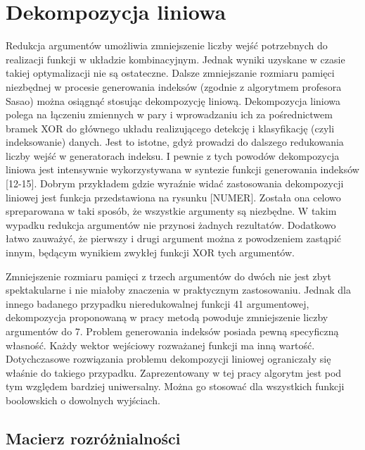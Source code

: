 \chapter{Dekompozycja liniowa}

Redukcja argumentów umożliwia zmniejszenie liczby wejść potrzebnych do realizacji funkcji w układzie kombinacyjnym.
Jednak wyniki uzyskane w czasie takiej optymalizacji nie są ostateczne.
Dalsze zmniejszanie rozmiaru pamięci niezbędnej w procesie generowania indeksów (zgodnie z algorytmem profesora Sasao) można osiągnąć stosując dekompozycję liniową.
Dekompozycja liniowa polega na  łączeniu zmiennych w pary i wprowadzaniu ich za pośrednictwem bramek XOR do głównego układu realizującego detekcję i klasyfikację (czyli indeksowanie) danych.
Jest to istotne, gdyż prowadzi do dalszego redukowania liczby wejść w generatorach indeksu.
I pewnie z tych powodów dekompozycja liniowa jest intensywnie wykorzystywana w syntezie funkcji generowania indeksów [12-15].
Dobrym przykładem gdzie wyraźnie widać zastosowania dekompozycji liniowej jest funkcja przedstawiona na rysunku [NUMER].
Została ona celowo spreparowana w taki sposób, że wszystkie argumenty są niezbędne.
W takim wypadku redukcja argumentów nie przynosi żadnych rezultatów.
Dodatkowo łatwo zauważyć, że pierwszy i drugi argument można z powodzeniem zastąpić innym, będącym wynikiem zwykłej funkcji XOR tych argumentów.

Zmniejszenie rozmiaru pamięci z trzech argumentów do dwóch nie jest zbyt spektakularne i nie miałoby znaczenia w praktycznym zastosowaniu.
Jednak dla innego badanego przypadku nieredukowalnej funkcji 41 argumentowej, dekompozycja proponowaną w pracy metodą powoduje zmniejszenie liczby argumentów do 7.
Problem generowania indeksów posiada pewną specyficzną własność.
Każdy wektor wejściowy rozważanej funkcji ma inną wartość.
Dotychczasowe rozwiązania problemu dekompozycji liniowej ograniczały się właśnie do takiego przypadku.
Zaprezentowany w tej pracy algorytm jest pod tym względem bardziej uniwersalny.
Można go stosować dla wszystkich funkcji boolowskich o dowolnych wyjściach.

\section{Macierz rozróżnialności}


